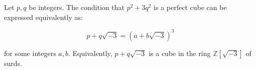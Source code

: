 Let $p, q$ be integers. The condition that $p^2 + 3q^2$ is a perfect cube can be expressed equivalently as:

$$
p + q\sqrt{-3} = (a + b\sqrt{-3})^3
$$

for some integers $a, b$. Equivalently, $p + q\sqrt{-3}$ is a cube in the ring $\mathbb{Z}[\sqrt{-3}]$ of surds.
